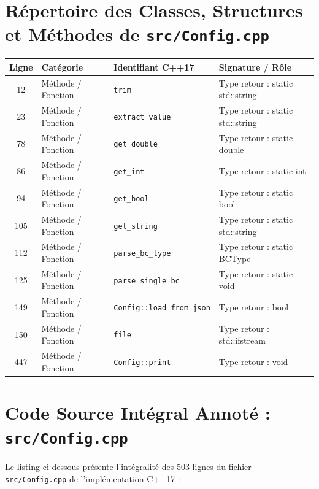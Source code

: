 \documentclass[10pt,a4paper,oneside]{book}
\begin{document}
\section{Répertoire des Classes, Structures et Méthodes de \texttt{src/Config.cpp}}
\begin{center}\small
\begin{tabular}{clll}
\toprule
\textbf{Ligne} & \textbf{Catégorie} & \textbf{Identifiant C++17} & \textbf{Signature / Rôle} \\
\midrule
12 & Méthode / Fonction & \texttt{trim} & Type retour : static std::string \\
23 & Méthode / Fonction & \texttt{extract\_value} & Type retour : static std::string \\
78 & Méthode / Fonction & \texttt{get\_double} & Type retour : static double \\
86 & Méthode / Fonction & \texttt{get\_int} & Type retour : static int \\
94 & Méthode / Fonction & \texttt{get\_bool} & Type retour : static bool \\
105 & Méthode / Fonction & \texttt{get\_string} & Type retour : static std::string \\
112 & Méthode / Fonction & \texttt{parse\_bc\_type} & Type retour : static BCType \\
125 & Méthode / Fonction & \texttt{parse\_single\_bc} & Type retour : static void \\
149 & Méthode / Fonction & \texttt{Config::load\_from\_json} & Type retour : bool \\
150 & Méthode / Fonction & \texttt{file} & Type retour : std::ifstream \\
447 & Méthode / Fonction & \texttt{Config::print} & Type retour : void \\
\bottomrule
\end{tabular}
\end{center}

\section{Code Source Intégral Annoté : \texttt{src/Config.cpp}}
Le listing ci-dessous présente l'intégralité des 503 lignes du fichier \texttt{src/Config.cpp} de l'implémentation C++17 :
\end{document}
